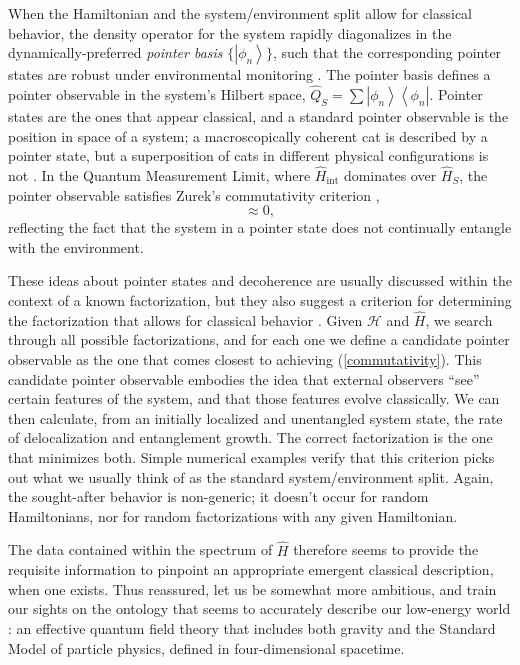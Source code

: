 \documentclass[12pt,english]{article}
\newcommand{\be}{\begin{equation}}
\newcommand{\ee}{\end{equation}}
\newcommand{\ham}{\hat{H}}
\newcommand{\HH}{\mathcal{H}}
\newcommand{\ket}[1]{\left| #1 \right\rangle}
\newcommand{\bra}[1]{\left\langle #1 \right |}
\begin{document}
When the Hamiltonian and the system/environment split allow for classical behavior, the density operator for the system rapidly diagonalizes in the dynamically-preferred \emph{pointer basis} $\{\ket{\phi_n}\}$, such that the corresponding pointer states are robust under environmental monitoring \citep{Zurek:1981xq}.
The pointer basis defines a pointer observable in the system's Hilbert space, $\hat{Q}_S = \sum \ket{\phi_n}\bra{\phi_n}$.
Pointer states are the ones that appear classical, and a standard pointer observable is the position in space of a system; a macroscopically coherent cat is described by a pointer state, but a superposition of cats in different physical configurations is not \citep{Joos:1984uk,Zurek:1994zq,riedel2012}.
In the Quantum Measurement Limit, where $\ham_\mathrm{int}$ dominates over $\ham_S$, the pointer observable satisfies Zurek's commutativity criterion \citep{Zurek:1981xq},
\be
  [\ham_\mathrm{int}, \hat{Q}_S\otimes \mathbb{I}_E] \approx 0,
  \label{commutativity}
\ee
reflecting the fact that the system in a pointer state does not continually entangle with the environment.

These ideas about pointer states and decoherence are usually discussed within the context of a known factorization, but they also suggest a criterion for determining the factorization that allows for classical behavior \citep{Carroll:2020gme}.
Given $\HH$ and $\ham$, we search through all possible factorizations, and for each one we define a candidate pointer observable as the one that comes closest to achieving (\ref{commutativity}).
This candidate pointer observable embodies the idea that external observers ``see'' certain features of the system, and that those features evolve classically.
We can then calculate, from an initially localized and unentangled system state, the rate of delocalization and entanglement growth.
The correct factorization is the one that minimizes both.
Simple numerical examples verify that this criterion picks out what we usually think of as the standard system/environment split.
Again, the sought-after behavior is non-generic; it doesn't occur for random Hamiltonians, nor for random factorizations with any given Hamiltonian.

The data contained within the spectrum of $\ham$ therefore seems to provide the requisite information to pinpoint an appropriate emergent classical description, when one exists.
Thus reassured, let us be somewhat more ambitious, and train our sights on the ontology that seems to accurately describe our low-energy world \citep{Carroll:2021yum}: an effective quantum field theory that includes both gravity and the Standard Model of particle physics, defined in four-dimensional spacetime.
\end{document}
